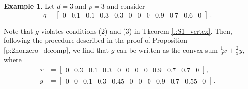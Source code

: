 \documentclass[12pt]{amsart}
\theoremstyle{definition}
\newtheorem{example}[thm]{Example}
\numberwithin{equation}{section}
\renewcommand\>{\rangle}
\newcommand\<{\langle}
\newcommand\0{\mathbf{0}}
\begin{document}
\begin{example}\label{ex:runningexample}
	Let $d = 3$ and $p = 3$ and consider 
	\[
		g = \begin{bmatrix}
			0 & 0.1 & 0.1 & 0.3 & 0.3 & 0 & 0 & 0 & 0.9 & 0.7 & 0.6 & 0
		\end{bmatrix} \, .
	\]
	
	Note that $g$ violates conditions (2) and (3) in Theorem \ref{t:S1_vertex}. Then, following the procedure described in the proof of Proposition \ref{p:2nonzero_decomp}, we find that $g$ can be written as the convex sum $\tfrac{1}{3}x + \tfrac{2}{3}y$, where 
	\begin{align*}
		x &= \begin{bmatrix}
			0 & 0.3 & 0.1 & 0.3 & 0 & 0 & 0 & 0 & 0.9 & 0.7 & 0.7 & 0
		\end{bmatrix},\\
		y &= \begin{bmatrix}
			0 & 0& 0.1 & 0.3 & 0.45 & 0 & 0 & 0 & 0.9 & 0.7 & 0.55 & 0
		\end{bmatrix}.
	\end{align*}
	

\end{example}
\end{document}
